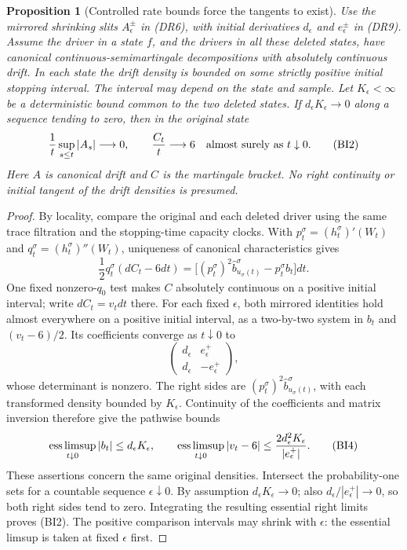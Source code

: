 \documentclass[11pt]{article}
\newtheorem{proposition}[theorem]{Proposition}
\theoremstyle{definition}\newtheorem{definition}[theorem]{Definition}
\theoremstyle{remark}\newtheorem{remark}[theorem]{Remark}
\begin{document}
\begin{proposition}[Controlled rate bounds force the tangents to exist]
\label{prop:cbias-derived-tangents}
Use the mirrored shrinking slits $A_\epsilon^\pm$ in (DR6), with initial
derivatives $d_\epsilon$ and $e_\epsilon^\pm$ in (DR9). Assume the driver
in a state $f$, and the drivers in all these deleted states, have canonical
continuous-semimartingale decompositions with absolutely continuous drift.
In each state the drift density is bounded on some strictly positive
initial stopping interval. The interval may depend on the state and sample.
Let $K_\epsilon<\infty$ be a deterministic bound common to the two
deleted states. If $d_\epsilon K_\epsilon\to0$ along a sequence tending
to zero, then in the original state
\[
 \frac1t\sup_{s\le t}|A_s|\longrightarrow0,
 \qquad \frac{C_t}{t}\longrightarrow6
 \quad\hbox{almost surely as }t\downarrow0.
 \tag{BI2}
\]
Here $A$ is canonical drift and $C$ is the martingale bracket. No right
continuity or initial tangent of the drift densities is presumed.
\end{proposition}
\begin{proof}
By locality, compare the original and each deleted driver using the same
trace filtration and the stopping-time capacity clocks. With
$p_t^\sigma=(h_t^\sigma)'(W_t)$ and
$q_t^\sigma=(h_t^\sigma)''(W_t)$, uniqueness of canonical
characteristics gives
\[
 \frac12q_t^\sigma(dC_t-6dt)
   =\bigl[(p_t^\sigma)^2\widehat b^\sigma_{u_\sigma(t)}
                    -p_t^\sigma b_t\bigr]dt.
 \tag{BI3}
\]
One fixed nonzero-$q_0$ test makes $C$ absolutely continuous on a positive
initial interval; write $dC_t=v_tdt$ there. For each fixed $\epsilon$, both
mirrored identities hold almost everywhere on a positive initial interval,
as a two-by-two system in $b_t$ and $(v_t-6)/2$. Its coefficients converge
as $t\downarrow0$ to
\[
 \begin{pmatrix}d_\epsilon&e_\epsilon^+\\
                 d_\epsilon&-e_\epsilon^+\end{pmatrix},
\]
whose determinant is nonzero. The right sides are
$(p_t^\sigma)^2\widehat b^\sigma_{u_\sigma(t)}$, with each transformed
density bounded by $K_\epsilon$. Continuity of the coefficients and matrix
inversion therefore give the pathwise bounds
\[
 \mathop{\rm ess\,limsup}_{t\downarrow0}|b_t|\le d_\epsilon K_\epsilon,
 \qquad
 \mathop{\rm ess\,limsup}_{t\downarrow0}|v_t-6|
       \le \frac{2d_\epsilon^2K_\epsilon}{|e_\epsilon^+|}.
 \tag{BI4}
\]
These assertions concern the same original densities. Intersect the
probability-one sets for a countable sequence $\epsilon\downarrow0$.
By assumption $d_\epsilon K_\epsilon\to0$; also
$d_\epsilon/|e_\epsilon^+|\to0$, so both right sides tend to zero. Integrating the resulting essential right limits
proves (BI2). The positive comparison intervals may shrink with
$\epsilon$: the essential limsup is taken at fixed $\epsilon$ first.
\end{proof}
\end{document}
